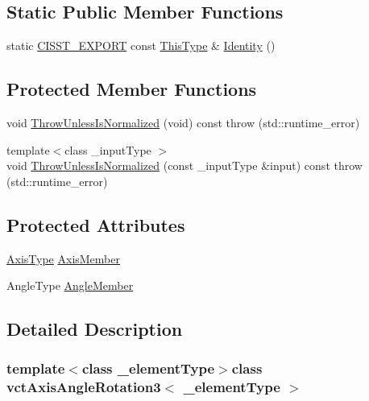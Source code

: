 \subsection*{Static Public Member Functions}
\begin{DoxyCompactItemize}
\item 
static \hyperlink{cmn_export_macros_8h_a99393e0c3ac434b2605235bbe20684f8}{C\+I\+S\+S\+T\+\_\+\+E\+X\+P\+O\+R\+T} const \hyperlink{classvct_axis_angle_rotation3_af654a8037b7b82a378f69cb1bfd9b8dd}{This\+Type} \& \hyperlink{classvct_axis_angle_rotation3_a66b018a0fc03eb011c286761aa00833b}{Identity} ()
\end{DoxyCompactItemize}
\subsection*{Protected Member Functions}
\begin{DoxyCompactItemize}
\item 
void \hyperlink{classvct_axis_angle_rotation3_a1849694a8937fd494daf2878aee541a2}{Throw\+Unless\+Is\+Normalized} (void) const   throw (std\+::runtime\+\_\+error)
\item 
{\footnotesize template$<$class \+\_\+input\+Type $>$ }\\void \hyperlink{classvct_axis_angle_rotation3_a680d5519113ed0c2687c0352261bb47c}{Throw\+Unless\+Is\+Normalized} (const \+\_\+input\+Type \&input) const   throw (std\+::runtime\+\_\+error)
\end{DoxyCompactItemize}
\subsection*{Protected Attributes}
\begin{DoxyCompactItemize}
\item 
\hyperlink{classvct_axis_angle_rotation3_a3178fd901bb60bb447711b9d5f7e7aae}{Axis\+Type} \hyperlink{classvct_axis_angle_rotation3_ae73a683f2aff0496ec2d15176c357d83}{Axis\+Member}
\item 
Angle\+Type \hyperlink{classvct_axis_angle_rotation3_aa04d755b8de3c1bf343c0c027a1af28f}{Angle\+Member}
\end{DoxyCompactItemize}


\subsection{Detailed Description}
\subsubsection*{template$<$class \+\_\+element\+Type$>$class vct\+Axis\+Angle\+Rotation3$<$ \+\_\+element\+Type $>$}

